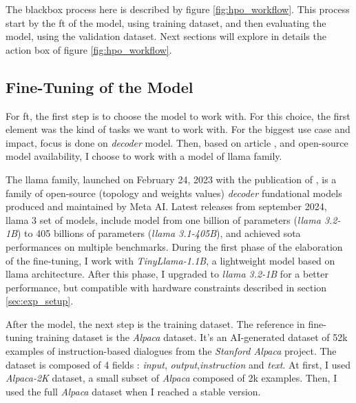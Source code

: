The blackbox process here is described by figure \ref{fig:hpo_workflow}. This process start by the \gls{ft} of the model, using training dataset, and then evaluating the model, using the validation dataset. Next sections will explore in details the action box of figure \ref{fig:hpo_workflow}.

\subsection{Fine-Tuning of the Model}
\label{sec:fine_tuning}

For \gls{ft}, the first step is to choose the model to work with. For this choice, the first element was the kind of tasks we want to work with. For the biggest use case and impact,  focus is done on \textit{\gls{decoder}} model. Then, based on article \cite{tribes_hyperparameter_2024}, and open-source model availability, I choose to work with a model of \gls{llama} family.

The \gls{llama} family, launched on February 24, 2023 with the publication of \cite{touvron_llama_2023}, is a family of open-source (topology and weights values) \textit{\gls{decoder}} fundational models produced and maintained by Meta AI. Latest releases from september 2024, \gls{llama} 3\cite{grattafiori_llama_2024} set of models, include model from one billion of parameters (\textit{\gls{llama} 3.2-1B}) to 405 billions of parameters (\textit{\gls{llama} 3.1-405B}), and achieved \acrlong{sota} performances on multiple benchmarks. During the first phase of the elaboration of the fine-tuning, I work with \textit{TinyLlama-1.1B}, a lightweight model based on \gls{llama} architecture. After this phase, I upgraded to \textit{\gls{llama} 3.2-1B} for a better performance, but compatible with hardware constraints described in section \ref{sec:exp_setup}.

After the model, the next step is the training dataset. The reference in fine-tuning training dataset is the \textit{Alpaca} dataset\cite{hashimoto_stanford_2024}. It's an AI-generated dataset of 52k examples of instruction-based dialogues from the \textit{Stanford Alpaca} project. The dataset is composed of 4 fields : \textit{input}, \textit{output},\textit{instruction} and \textit{text}. At first, I used \textit{Alpaca-2K} dataset, a small subset of \textit{Alpaca} composed of 2k examples. Then, I used the full \textit{Alpaca} dataset when I reached a stable version. 

